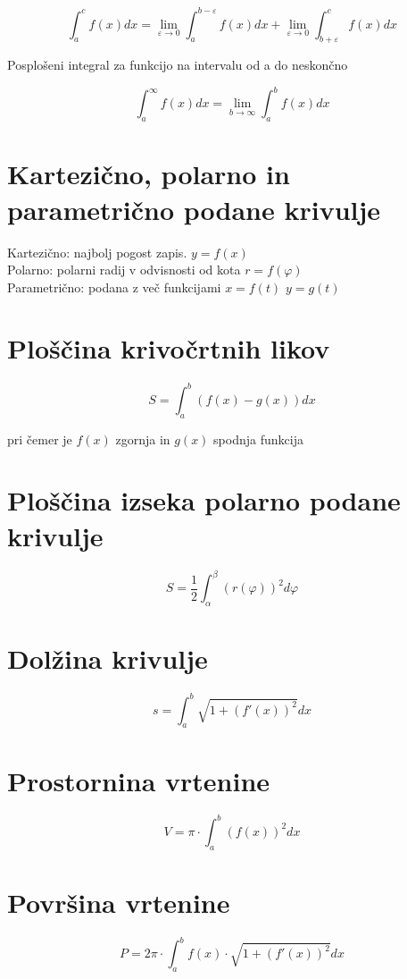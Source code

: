 \documentclass[12pt]{report}
\begin{document}
\[\int_a^cf(x)dx=\lim_{\varepsilon \to 0}\int_a^{b-\varepsilon}f(x)dx+\lim_{\varepsilon \to 0}\int_{b+\varepsilon}^cf(x)dx\]

Posplošeni integral za funkcijo na intervalu od a do neskončno

\[\int_a^\infty	f(x)dx = \lim_{b \to \infty}\int_a^bf(x)dx\] 

\section*{Kartezično, polarno in parametrično podane krivulje}
Kartezično: najbolj pogost zapis. $y=f(x)$\\
Polarno: polarni radij v odvisnosti od kota $r=f(\varphi)$\\
Parametrično: podana z več funkcijami $x=f(t)$ $y=g(t)$

\section*{Ploščina krivočrtnih likov}
\[S=\int_{a}^{b}(f(x)-g(x))dx\]

pri čemer je $f(x)$ zgornja in $g(x)$ spodnja funkcija


\section*{Ploščina izseka polarno podane krivulje}
\[S=\frac{1}{2}\int_{\alpha}^{\beta}(r(\varphi))^2d\varphi\]

\section*{Dolžina krivulje}
\[s=\int_{a}^{b}\sqrt{1+{(f'(x))}^2}dx\]

\section*{Prostornina vrtenine}
\[V=\pi\cdot\int_{a}^{b}{(f(x))}^2dx\]

\section*{Površina vrtenine}
\[ P=2\pi\cdot\int_{a}^{b}f(x)\cdot\sqrt{1+{(f'(x))}^2}dx\]
\end{document}
